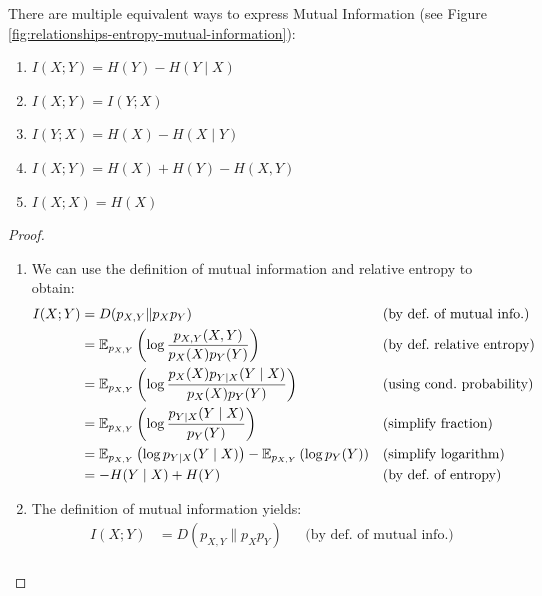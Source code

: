\begin{theorem}
    There are multiple equivalent ways to express Mutual Information (see Figure \ref{fig:relationships-entropy-mutual-information}):
    \begin{enumerate}
        \item $I(X; Y) = H(Y) - H(Y \mid X)$
        \item $I(X; Y) = I(Y; X)$
        \item $I(Y; X) = H(X) - H(X \mid Y)$
        \item $I(X; Y) = H(X) + H(Y) - H(X, Y)$
        \item $I(X; X) = H(X)$
    \end{enumerate}
\end{theorem}
\begin{proof}
    \begin{enumerate}
        \item We can use the definition of mutual information and relative entropy to obtain:
            \begin{align*}
                I(X; Y) &= D(p_{X,Y} \| p_X p_Y)                                                                                             && \text{(by def.~of mutual info.)}\\
                        &= \mathbb{E}_{p_{X,Y}}\left(\log \frac{p_{X,Y}(X, Y)}{p_X(X)p_Y(Y)}\right)                                            && \text{(by def.~relative entropy)} \\
                        &= \mathbb{E}_{p_{X,Y}}\left(\log \frac{p_X(X)p_{Y \mid X}(Y \mid X)}{p_X(X)p_Y(Y)}\right)                            && \text{(using cond.~probability)} \\
                        &= \mathbb{E}_{p_{X,Y}}\left(\log \frac{p_{Y \mid X}(Y \mid X)}{p_Y(Y)}\right)                                        && \text{(simplify fraction)} \\
                        &= \mathbb{E}_{p_{X,Y}}\left(\log p_{Y \mid X}(Y \mid X)\right) - \mathbb{E}_{p_{X,Y}}\left(\log p_Y(Y)\right)            && \text{(simplify logarithm)} \\
                        &= -H(Y \mid X) + H(Y)                                                                                              && \text{(by def.~of entropy)}
            \end{align*}
        \item The definition of mutual information yields:
            \begin{align*}
                I(X; Y) &= D(p_{X,Y} \| p_X p_Y)       && \text{(by def.~of mutual info.)} \\

\end{align*}
\end{enumerate}
\end{proof}
